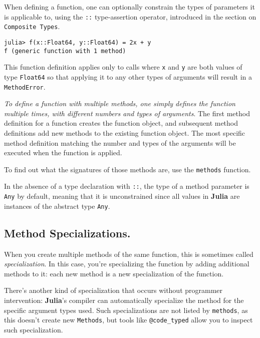 \documentclass[
]{article}
\begin{document}
When defining a function, one can optionally constrain the types of
parameters it is applicable to, using the \texttt{::} type-assertion
operator, introduced in the section on \texttt{Composite\ Types}.

\begin{verbatim}
julia> f(x::Float64, y::Float64) = 2x + y
f (generic function with 1 method)
\end{verbatim}

This function definition applies only to calls where \texttt{x} and
\texttt{y} are both values of type \texttt{Float64} so that applying it
to any other types of arguments will result in a \texttt{MethodError}.

\emph{To define a function with multiple methods, one simply defines the
function multiple times, with different numbers and types of arguments}.
The first method definition for a function creates the function object,
and subsequent method definitions add new methods to the existing
function object. The most specific method definition matching the number
and types of the arguments will be executed when the function is
applied.

To find out what the signatures of those methods are, use the
\texttt{methods} function.

In the absence of a type declaration with \texttt{::}, the type of a
method parameter is \texttt{Any} by default, meaning that it is
unconstrained since all values in \textbf{Julia} are instances of the
abstract type \texttt{Any}.

\hypertarget{method-specializations.}{%
\subsection{Method Specializations.}\label{method-specializations.}}

When you create multiple methods of the same function, this is sometimes
called \emph{specialization}. In this case, you're specializing the
function by adding additional methods to it: each new method is a new
specialization of the function.

There's another kind of specialization that occurs without programmer
intervention: \textbf{Julia}'s compiler can automatically specialize the
method for the specific argument types used. Such specializations are
not listed by \texttt{methods}, as this doesn't create new
\texttt{Methods}, but tools like \texttt{@code\_typed} allow you to
inspect such specialization.
\end{document}
